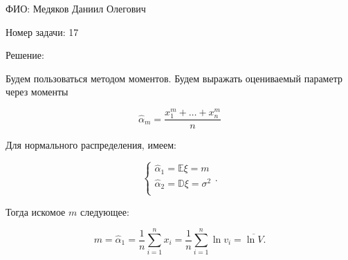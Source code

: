 \documentclass[14pt]{extarticle}
\begin{document}
ФИО: Медяков Даниил Олегович

\vspace{10pt}

Номер задачи: 17

\vspace{10pt}

Решение:

\vspace{10pt}

Будем пользоваться методом моментов. Будем выражать оцениваемый параметр через моменты

\begin{equation*}
    \hat{\alpha}_m = \frac{x_1^m + \ldots + x_n^m}{n}
\end{equation*}

Для нормального распределения, имеем:

\begin{equation*}
    \begin{cases}
        \hat{\alpha}_1 = \mathbb E\xi = m\\
        \hat{\alpha}_2 = \mathbb D\xi = \sigma^2\\
    \end{cases}.
\end{equation*}

Тогда искомое $m$ следующее:

\begin{equation*}
    m = \hat{\alpha}_1 = \frac{1}{n}\sum\limits_{i=1}^n x_i = \frac{1}{n}\sum\limits_{i=1}^n \ln v_i = \overline{\ln V}.
\end{equation*}
\end{document}
